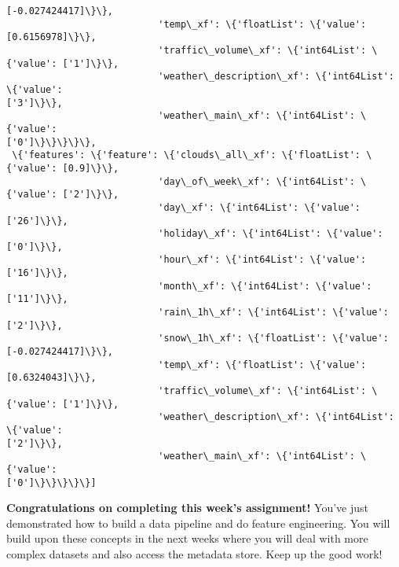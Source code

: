 \documentclass[11pt]{article}
\begin{document}
\begin{Verbatim}[commandchars=\\\{\}]
[-0.027424417]\}\},
                           'temp\_xf': \{'floatList': \{'value': [0.6156978]\}\},
                           'traffic\_volume\_xf': \{'int64List': \{'value': ['1']\}\},
                           'weather\_description\_xf': \{'int64List': \{'value':
['3']\}\},
                           'weather\_main\_xf': \{'int64List': \{'value':
['0']\}\}\}\}\},
 \{'features': \{'feature': \{'clouds\_all\_xf': \{'floatList': \{'value': [0.9]\}\},
                           'day\_of\_week\_xf': \{'int64List': \{'value': ['2']\}\},
                           'day\_xf': \{'int64List': \{'value': ['26']\}\},
                           'holiday\_xf': \{'int64List': \{'value': ['0']\}\},
                           'hour\_xf': \{'int64List': \{'value': ['16']\}\},
                           'month\_xf': \{'int64List': \{'value': ['11']\}\},
                           'rain\_1h\_xf': \{'int64List': \{'value': ['2']\}\},
                           'snow\_1h\_xf': \{'floatList': \{'value':
[-0.027424417]\}\},
                           'temp\_xf': \{'floatList': \{'value': [0.6324043]\}\},
                           'traffic\_volume\_xf': \{'int64List': \{'value': ['1']\}\},
                           'weather\_description\_xf': \{'int64List': \{'value':
['2']\}\},
                           'weather\_main\_xf': \{'int64List': \{'value':
['0']\}\}\}\}\}]
    \end{Verbatim}

    \textbf{Congratulations on completing this week's assignment!} You've
just demonstrated how to build a data pipeline and do feature
engineering. You will build upon these concepts in the next weeks where
you will deal with more complex datasets and also access the metadata
store. Keep up the good work!


    
    
    
\end{document}
